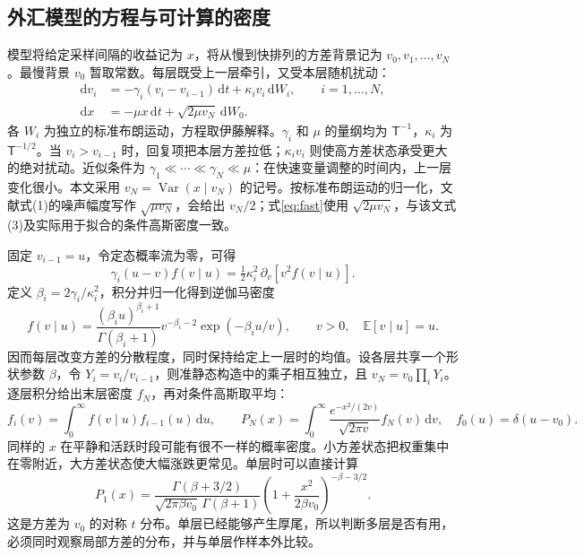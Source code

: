 \documentclass[11pt,a4paper]{article}
\begin{document}
\subsection{外汇模型的方程与可计算的密度}\label{sec:model}
模型将给定采样间隔的收益记为 $x$，将从慢到快排列的方差背景记为 $v_0,v_1,\ldots,v_N$。最慢背景 $v_0$ 暂取常数。每层既受上一层牵引，又受本层随机扰动：
\begin{align}
 \mathrm dv_i&=-\gamma_i(v_i-v_{i-1})\,\mathrm dt+\kappa_i v_i\,\mathrm dW_i,\qquad i=1,\ldots,N, \label{eq:hier}\\
 \mathrm dx&=-\mu x\,\mathrm dt+\sqrt{2\mu v_N}\,\mathrm dW_0. \label{eq:fast}
\end{align}
各 $W_i$ 为独立的标准布朗运动，方程取伊藤解释。$\gamma_i$ 和 $\mu$ 的量纲均为 $\mathsf T^{-1}$，$\kappa_i$ 为 $\mathsf T^{-1/2}$。当 $v_i>v_{i-1}$ 时，回复项把本层方差拉低；$\kappa_i v_i$ 则使高方差状态承受更大的绝对扰动。近似条件为 $\gamma_1\ll\cdots\ll\gamma_N\ll\mu$：在快速变量调整的时间内，上一层变化很小。本文采用 $v_N=\operatorname{Var}(x\mid v_N)$ 的记号。按标准布朗运动的归一化，文献\cite{vasconcelos2024}式(1)的噪声幅度写作 $\sqrt{\mu v_N}$，会给出 $v_N/2$；式\eqref{eq:fast}使用 $\sqrt{2\mu v_N}$，与该文式(3)及实际用于拟合的条件高斯密度一致。

固定 $v_{i-1}=u$，令定态概率流为零，可得
\[
 \gamma_i(u-v)f(v\mid u)=\tfrac12\kappa_i^2\,\partial_v[v^2 f(v\mid u)].
\]
定义 $\beta_i=2\gamma_i/\kappa_i^2$，积分并归一化得到逆伽马密度
\begin{equation}
 f(v\mid u)=\frac{(\beta_i u)^{\beta_i+1}}{\Gamma(\beta_i+1)}
 v^{-\beta_i-2}\exp(-\beta_i u/v),\qquad v>0,\quad \mathbb E[v\mid u]=u. \label{eq:kernel}
\end{equation}
因而每层改变方差的分散程度，同时保持给定上一层时的均值。设各层共享一个形状参数 $\beta$，令 $Y_i=v_i/v_{i-1}$，则准静态构造中的乘子相互独立，且 $v_N=v_0\prod_iY_i$。逐层积分给出末层密度 $f_N$，再对条件高斯取平均：
\begin{equation}
 f_i(v)=\int_0^\infty f(v\mid u) f_{i-1}(u)\,\mathrm du,\qquad
 P_N(x)=\int_0^\infty\frac{e^{-x^2/(2v)}}{\sqrt{2\pi v}}f_N(v)\,\mathrm dv,\quad
 f_0(u)=\delta(u-v_0). \label{eq:mix}
\end{equation}
同样的 $x$ 在平静和活跃时段可能有很不一样的概率密度。小方差状态把权重集中在零附近，大方差状态使大幅涨跌更常见。单层时可以直接计算
\[
 P_1(x)=\frac{\Gamma(\beta+3/2)}{\sqrt{2\pi\beta v_0}\,\Gamma(\beta+1)}
 \left(1+\frac{x^2}{2\beta v_0}\right)^{-\beta-3/2}.
\]
这是方差为 $v_0$ 的对称 $t$ 分布。单层已经能够产生厚尾，所以判断多层是否有用，必须同时观察局部方差的分布，并与单层作样本外比较。
\end{document}
